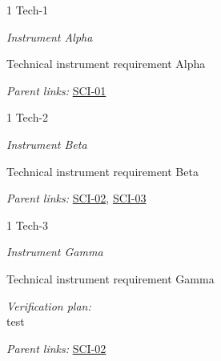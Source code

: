\begin{frame}{1 Tech-1}

\emph{Instrument Alpha}

Technical instrument requirement Alpha

\emph{Parent links:} \href{L2.html\#SCI-01}{SCI-01}

\end{frame}

\begin{frame}{1 Tech-2}

\emph{Instrument Beta}

Technical instrument requirement Beta

\emph{Parent links:} \href{L2.html\#SCI-02}{SCI-02},
\href{L2.html\#SCI-03}{SCI-03}

\end{frame}

\begin{frame}{1 Tech-3}

\emph{Instrument Gamma}

Technical instrument requirement Gamma

\emph{Verification plan:}\\
test

\emph{Parent links:} \href{L2.html\#SCI-02}{SCI-02}

\end{frame}
